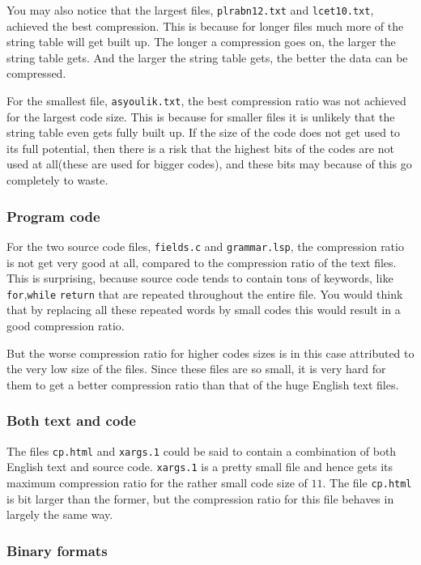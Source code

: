You may also notice that the largest files, \verb|plrabn12.txt| and
\verb|lcet10.txt|, achieved the best compression. This is because for
longer files much more of the string table will get built up. The
longer a compression goes on, the larger the string table gets. And
the larger the string table gets, the better the data can be
compressed.

For the smallest file, \verb|asyoulik.txt|, the best compression ratio
was not achieved for the largest code size. This is because for
smaller files it is unlikely that the string table even gets fully
built up. If the size of the code does not get used to its full
potential, then there is a risk that the highest bits of the codes are
not used at all(these are used for bigger codes), and these bits may
because of this go completely to waste.

\subsubsection{Program code}

For the two source code files, \verb|fields.c| and \verb|grammar.lsp|,
the compression ratio is not get very good at all, compared to the
compression ratio of the text files. This is surprising, because
source code tends to contain tons of keywords, like
\verb|for|,\verb|while| \verb|return| that are repeated throughout the
entire file. You would think that by replacing all these repeated
words by small codes this would result in a good compression ratio.

But the worse compression ratio for higher codes sizes is in this case
attributed to the very low size of the files. Since these files are so
small, it is very hard for them to get a better compression ratio than
that of the huge English text files.

\subsubsection{Both text and code}

The files \verb|cp.html| and \verb|xargs.1| could be said to contain a
combination of both English text and source
code. \verb|xargs.1| is a pretty small file and hence gets its maximum
compression ratio for the rather small code size of $11$. The file
\verb|cp.html| is bit larger than the former, but the compression
ratio for this file behaves in largely the same way.

\subsubsection{Binary formats}

